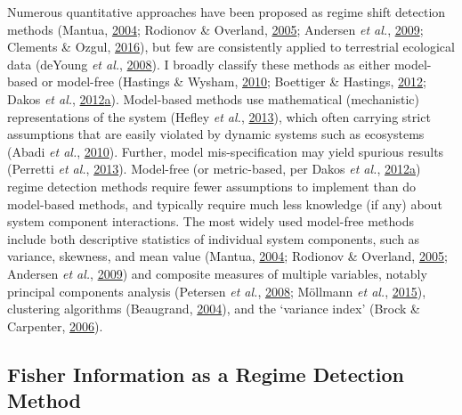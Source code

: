 \documentclass[12pt,twoside,openany]{reedthesis}
\begin{document}
Numerous quantitative approaches have been proposed as regime shift detection methods (Mantua, \protect\hyperlink{ref-mantua_methods_2004}{2004}; Rodionov \& Overland, \protect\hyperlink{ref-rodionov_application_2005}{2005}; Andersen \emph{et al.}, \protect\hyperlink{ref-andersen_ecological_2009}{2009}; Clements \& Ozgul, \protect\hyperlink{ref-clements_including_2016}{2016}), but few are consistently applied to terrestrial ecological data (deYoung \emph{et al.}, \protect\hyperlink{ref-deyoung_regime_2008}{2008}). I broadly classify these methods as either model-based or model-free (Hastings \& Wysham, \protect\hyperlink{ref-hastings2010regime}{2010}; Boettiger \& Hastings, \protect\hyperlink{ref-boettiger_quantifying_2012}{2012}; Dakos \emph{et al.}, \protect\hyperlink{ref-dakos2012methods}{2012}\protect\hyperlink{ref-dakos2012methods}{a}). Model-based methods use mathematical (mechanistic) representations of the system (Hefley \emph{et al.}, \protect\hyperlink{ref-hefley2013statistical}{2013}), which often carrying strict assumptions that are easily violated by dynamic systems such as ecosystems (Abadi \emph{et al.}, \protect\hyperlink{ref-abadi2010assessment}{2010}). Further, model mis-specification may yield spurious results (Perretti \emph{et al.}, \protect\hyperlink{ref-perretti_model-free_2013}{2013}). Model-free (or metric-based, per Dakos \emph{et al.}, \protect\hyperlink{ref-dakos2012methods}{2012}\protect\hyperlink{ref-dakos2012methods}{a}) regime detection methods require fewer assumptions to implement than do model-based methods, and typically require much less knowledge (if any) about system component interactions. The most widely used model-free methods include both descriptive statistics of individual system components, such as variance, skewness, and mean value (Mantua, \protect\hyperlink{ref-mantua_methods_2004}{2004}; Rodionov \& Overland, \protect\hyperlink{ref-rodionov_application_2005}{2005}; Andersen \emph{et al.}, \protect\hyperlink{ref-andersen_ecological_2009}{2009}) and composite measures of multiple variables, notably principal components analysis (Petersen \emph{et al.}, \protect\hyperlink{ref-petersen2008regime}{2008}; Möllmann \emph{et al.}, \protect\hyperlink{ref-mollmann2015marine}{2015}), clustering algorithms (Beaugrand, \protect\hyperlink{ref-beaugrand2004north}{2004}), and the `variance index' (Brock \& Carpenter, \protect\hyperlink{ref-brock_variance_2006}{2006}).

\hypertarget{fisher-information-as-a-regime-detection-method}{%
\subsection{Fisher Information as a Regime Detection Method}\label{fisher-information-as-a-regime-detection-method}}
\end{document}
